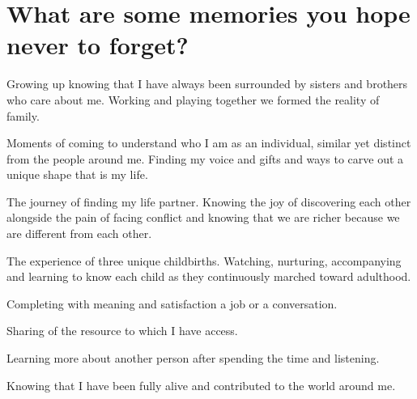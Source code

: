 \section{What are some memories you hope never to forget?}
Growing up knowing that I have always been surrounded by sisters and brothers who care about me.
Working and playing together we formed the reality of family.

Moments of coming to understand who I am as an individual, similar yet distinct from the people around me.
Finding my voice and gifts and ways to carve out a unique shape that is my life.

The journey of finding my life partner.
Knowing the joy of discovering each other alongside the pain of facing conflict and knowing that we are richer because we are different from each other.

The experience of three unique childbirths.
Watching, nurturing, accompanying and learning to know each child as they continuously marched toward adulthood.

Completing with meaning and satisfaction a job or a conversation.

Sharing of the resource to which I have access.

Learning more about another person after spending the time and listening.

Knowing that I have been fully alive and contributed to the world around me.







